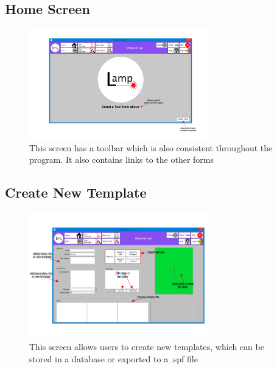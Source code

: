 \documentclass[oneside,openany,11pt,a4paper]{report}
\begin{document}
\subsection{Home Screen}
\begin{figure}[H]
	\centering
	\includegraphics[width=0.7\textwidth]{screen/home.png}
	\caption{This screen has a toolbar which is also consistent throughout the program. It also contains links to the other forms }
\end{figure}

\subsection{Create New Template}
\begin{figure}[H]
	\centering
	\includegraphics[width=0.7\textwidth]{screen/newtemplate.png}
	\caption{This screen allows users to create new templates, which can be stored in a database or exported to a .spf file}
\end{figure}
\end{document}
